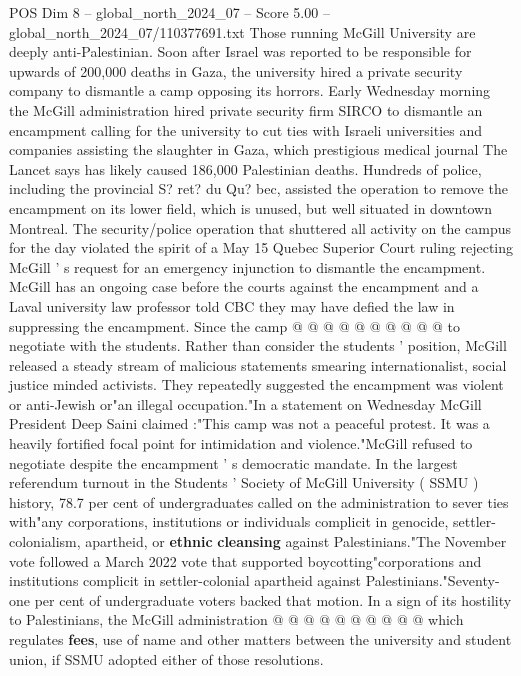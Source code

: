 \begin{textsample}{POS Dim 8 – global\_north\_2024\_07 – Score 5.00 – global\_north\_2024\_07/110377691.txt}  \label{ex:f8_pos_263}
Those running McGill University are deeply anti-Palestinian.
Soon after Israel was reported to be responsible for upwards of 200,000 deaths in Gaza, the university hired a private security company to dismantle a camp opposing its horrors.
Early Wednesday morning the McGill administration hired private security firm SIRCO to dismantle an encampment calling for the university to cut ties with Israeli universities and companies assisting the slaughter in Gaza, which prestigious medical journal The Lancet says has likely caused 186,000 Palestinian deaths.
Hundreds of police, including the provincial S? ret? du Qu? bec, assisted the operation to remove the encampment on its lower field, which is unused, but well situated in downtown Montreal.
The security/police operation that shuttered all activity on the campus for the day violated the spirit of a May 15 Quebec Superior Court ruling rejecting McGill ' s request for an emergency injunction to dismantle the encampment.
McGill has an ongoing case before the courts against the encampment and a Laval university law professor told CBC they may have defied the law in suppressing the encampment.
Since the camp @ @ @ @ @ @ @ @ @ @ to negotiate with the students.
Rather than consider the students ' position, McGill released a steady stream of malicious statements smearing internationalist, social justice minded activists.
They repeatedly suggested the encampment was violent or anti-Jewish or"an illegal occupation."In a statement on Wednesday McGill President Deep Saini claimed :"This camp was not a peaceful protest.
It was a heavily fortified focal point for intimidation and violence."McGill refused to negotiate despite the encampment ' s democratic mandate.
In the largest referendum turnout in the Students ' Society of McGill University ( SSMU ) history, 78.7 per cent of undergraduates called on the administration to sever ties with"any corporations, institutions or individuals complicit in genocide, settler-colonialism, apartheid, or \textbf{ethnic} \textbf{cleansing} against Palestinians."The November vote followed a March 2022 vote that supported boycotting"corporations and institutions complicit in settler-colonial apartheid against Palestinians."Seventy-one per cent of undergraduate voters backed that motion.
In a sign of its hostility to Palestinians, the McGill administration @ @ @ @ @ @ @ @ @ @ which regulates \textbf{fees}, use of name and other matters between the university and student union, if SSMU adopted either of those resolutions.

\end{textsample}
